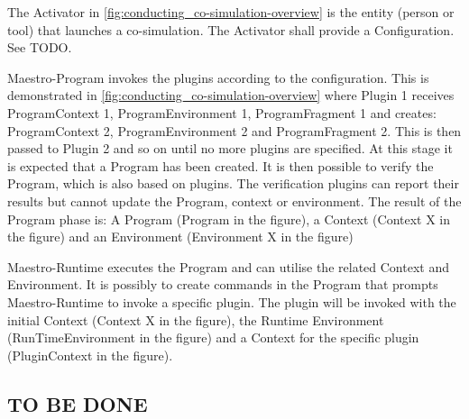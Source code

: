 The Activator in \cref{fig:conducting_co-simulation-overview} is the entity
(person or tool) that launches a co-simulation. The Activator shall provide a
Configuration. See TODO.

Maestro-Program invokes the plugins according to the configuration. This is
demonstrated in \cref{fig:conducting_co-simulation-overview} where Plugin 1
receives ProgramContext 1, ProgramEnvironment 1, ProgramFragment 1 and creates:
ProgramContext 2, ProgramEnvironment 2 and ProgramFragment 2. This is then
passed to Plugin 2 and so on until no more plugins are specified. At this stage
it is expected that a Program has been created. It is then possible to verify
the Program, which is also based on plugins. The verification plugins can report
their results but cannot update the Program, context or environment. The result
of the Program phase is: A Program (Program in the figure), a Context (Context X
in the figure) and an Environment (Environment X in the figure)

Maestro-Runtime executes the Program and can utilise the related Context and
Environment. It is possibly to create commands in the Program that prompts
Maestro-Runtime to invoke a specific plugin. The plugin will be invoked with the
initial Context (Context X in the figure), the Runtime Environment
(RunTimeEnvironment in the figure) and a Context for the specific plugin
(PluginContext in the figure).



\subsection{TO BE DONE}
\begin{itemize}

\end{itemize}


